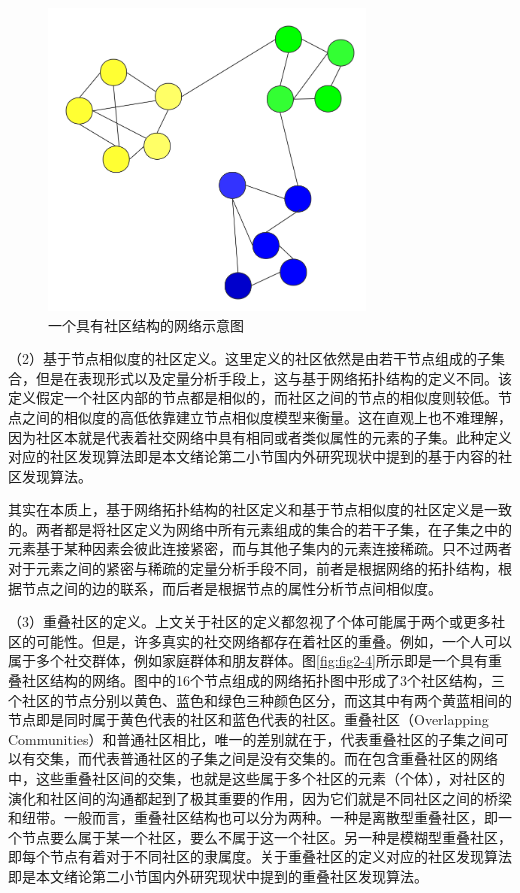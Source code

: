 \begin{figure}
  \centering
  \includegraphics[width=0.75\textwidth]{figures/fig2-3}
  \caption{一个具有社区结构的网络示意图}\label{fig:fig2-3}
\end{figure}

（2）基于节点相似度的社区定义。这里定义的社区依然是由若干节点组成的子集合，但是在表现形式以及定量分析手段上，这与基于网络拓扑结构的定义不同。该定义假定一个社区内部的节点都是相似的，而社区之间的节点的相似度则较低。节点之间的相似度的高低依靠建立节点相似度模型来衡量。这在直观上也不难理解，因为社区本就是代表着社交网络中具有相同或者类似属性的元素的子集。此种定义对应的社区发现算法即是本文绪论第二小节国内外研究现状中提到的基于内容的社区发现算法。

其实在本质上，基于网络拓扑结构的社区定义和基于节点相似度的社区定义是一致的。两者都是将社区定义为网络中所有元素组成的集合的若干子集，在子集之中的元素基于某种因素会彼此连接紧密，而与其他子集内的元素连接稀疏。只不过两者对于元素之间的紧密与稀疏的定量分析手段不同，前者是根据网络的拓扑结构，根据节点之间的边的联系，而后者是根据节点的属性分析节点间相似度。

（3）重叠社区的定义。上文关于社区的定义都忽视了个体可能属于两个或更多社区的可能性。但是，许多真实的社交网络都存在着社区的重叠。例如，一个人可以属于多个社交群体，例如家庭群体和朋友群体。图\ref{fig:fig2-4}所示即是一个具有重叠社区结构的网络。图中的16个节点组成的网络拓扑图中形成了3个社区结构，三个社区的节点分别以黄色、蓝色和绿色三种颜色区分，而这其中有两个黄蓝相间的节点即是同时属于黄色代表的社区和蓝色代表的社区。重叠社区（Overlapping Communities）和普通社区相比，唯一的差别就在于，代表重叠社区的子集之间可以有交集，而代表普通社区的子集之间是没有交集的。而在包含重叠社区的网络中，这些重叠社区间的交集，也就是这些属于多个社区的元素（个体），对社区的演化和社区间的沟通都起到了极其重要的作用，因为它们就是不同社区之间的桥梁和纽带。一般而言，重叠社区结构也可以分为两种。一种是离散型重叠社区，即一个节点要么属于某一个社区，要么不属于这一个社区。另一种是模糊型重叠社区，即每个节点有着对于不同社区的隶属度。关于重叠社区的定义对应的社区发现算法即是本文绪论第二小节国内外研究现状中提到的重叠社区发现算法。

